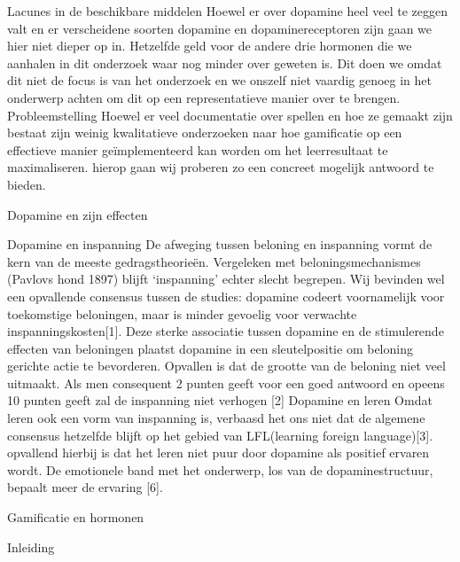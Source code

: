 \documentclass{hogent-article}
\begin{document}
Lacunes in de beschikbare middelen
Hoewel er over dopamine heel veel te zeggen valt en er verscheidene soorten dopamine en dopaminereceptoren zijn gaan we hier niet dieper op in. Hetzelfde geld voor de andere drie hormonen die we aanhalen in dit onderzoek waar nog minder over geweten is. Dit doen we omdat dit niet de focus is van het onderzoek en we onszelf niet vaardig genoeg in het onderwerp achten om dit op een representatieve manier over te brengen.
Probleemstelling
Hoewel er veel documentatie over spellen en hoe ze gemaakt zijn bestaat zijn weinig kwalitatieve onderzoeken naar hoe gamificatie op een effectieve manier geïmplementeerd kan worden om het leerresultaat te maximaliseren. hierop gaan wij proberen zo een concreet mogelijk antwoord te bieden.

Dopamine en zijn effecten

Dopamine en inspanning
De afweging tussen beloning en inspanning vormt de kern van de meeste gedragstheorieën. Vergeleken met beloningsmechanismes (Pavlovs hond 1897) blijft ‘inspanning’ echter slecht begrepen. Wij bevinden wel een opvallende consensus tussen de studies: dopamine codeert voornamelijk voor toekomstige beloningen, maar is minder gevoelig voor verwachte inspanningskosten[1]. Deze sterke associatie tussen dopamine en de stimulerende effecten van beloningen plaatst dopamine in een sleutelpositie om beloning gerichte actie te bevorderen. Opvallen is dat de grootte van de beloning niet veel uitmaakt. Als men consequent 2 punten geeft voor een goed antwoord en opeens 10 punten geeft zal de inspanning niet verhogen [2]
Dopamine en leren
Omdat leren ook een vorm van inspanning is, verbaasd het ons niet dat de algemene consensus hetzelfde blijft op het gebied van LFL(learning foreign language)[3]. opvallend hierbij is dat het leren niet puur door dopamine als positief ervaren wordt. De emotionele band met het onderwerp, los van de dopaminestructuur, bepaalt meer de ervaring [6].

Gamificatie en hormonen

Inleiding
\end{document}

